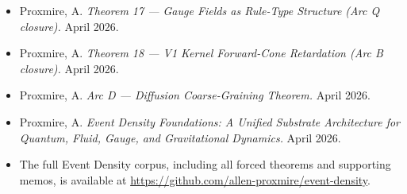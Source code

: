 \documentclass[11pt,a4paper]{article}
\begin{document}
\begin{itemize}[noitemsep]
\item Proxmire, A. \textit{Theorem 17 --- Gauge Fields as Rule-Type Structure (Arc Q closure).} April 2026.
\item Proxmire, A. \textit{Theorem 18 --- V1 Kernel Forward-Cone Retardation (Arc B closure).} April 2026.
\item Proxmire, A. \textit{Arc D --- Diffusion Coarse-Graining Theorem.} April 2026.
\item Proxmire, A. \textit{Event Density Foundations: A Unified Substrate Architecture for Quantum, Fluid, Gauge, and Gravitational Dynamics.} April 2026.
\item The full Event Density corpus, including all forced theorems and supporting memos, is available at \url{https://github.com/allen-proxmire/event-density}.
\end{itemize}
\end{document}
